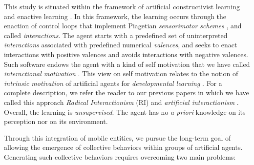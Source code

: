 \documentclass[conference]{IEEEtran}
\begin{document}
This study is situated within the framework of artificial constructivist learning \cite{wang_new_2012} and enactive learning \cite{froese2009enactiveAI}. 
In this framework, the learning occurs through the enaction of control loops that implement Piagetian \textit{sensorimotor schemes} \cite{piaget2013construction}, and called \textit{interactions}.
The agent starts with a predefined set of uninterpreted \textit{interactions} associated with predefined numerical \textit{valences}, and seeks to enact interactions with positive valences and avoids interactions with negative valences.
Such software endows the agent with a kind of self motivation that we have called \textit{interactional motivation} \cite{georgeon_interactional_2012}.
This view on self motivation relates to the notion of \textit{intrinsic motivation} of artificial agents for \textit{developmental learning} \cite{oudeyer_intrinsic_2007}.
For a complete description, we refer the reader to our previous papers in which we have called this approach \textit{Radical Interactionism} (RI) \cite{georgeon:radical} and \textit{artificial interactionism} \cite{GuillerminGeorgeon2022}. 
Overall, the learning is \textit{unsupervised}. 
The agent has no \textit{a priori} knowledge on its perception nor on its environment.




Through this integration of mobile entities,
we pursue the long-term goal of allowing the emergence of collective behaviors within groups of artificial agents. Generating such collective behaviors %
requires overcoming two main problems:
\end{document}
